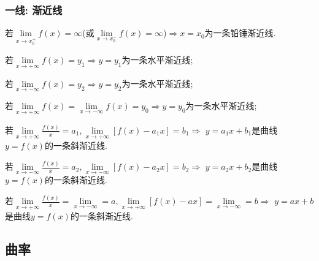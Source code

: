 \subsubsection{一线: 渐近线}
\par \vspace{.5em}
若$ \lim\limits_{x\rightarrow x_{0}^{+}}f(x)=\infty $(或$ \lim\limits_{x\rightarrow x_{0}^{-}}f(x)=\infty $)$ \Rightarrow x=x_{0} $为一条铅锤渐近线.\par \vspace{.5em}
\par \vspace{.5em}
若$ \lim\limits_{x\rightarrow +\infty}f(x)=y_{1}\Rightarrow y=y_{1} $为一条水平渐近线; \par 若$ \lim\limits_{x\rightarrow -\infty}f(x)=y_{2}\Rightarrow y=y_{2} $为一条水平渐近线;\par
若$ \lim\limits_{x\rightarrow +\infty}f(x)=\lim\limits_{x\rightarrow -\infty}f(x)=y_{0}\Rightarrow y=y_{0} $为一条水平渐近线;\par \vspace{.5em}
\par \vspace{.5em}
若$ \lim\limits_{x\rightarrow +\infty}\frac{f(x)}{x}=a_{1}, \lim\limits_{x\rightarrow +\infty}[f(x)-a_{1}x]=b_{1}\Rightarrow $ $ y=a_{1}x+b_{1} $是曲线$ y=f(x) $的一条斜渐近线. \par
若$ \lim\limits_{x\rightarrow -\infty}\frac{f(x)}{x}=a_{2}, \lim\limits_{x\rightarrow -\infty}[f(x)-a_{2}x]=b_{2}\Rightarrow $ $ y=a_{2}x+b_{2} $是曲线$ y=f(x) $的一条斜渐近线. \par
若$ \lim\limits_{x\rightarrow +\infty}\frac{f(x)}{x}=\lim\limits_{x\rightarrow -\infty}=a, \lim\limits_{x\rightarrow +\infty}[f(x)-ax]=\lim\limits_{x\rightarrow -\infty}=b\Rightarrow $ $ y=ax+b $是曲线$ y=f(x) $的一条斜渐近线. \par
\subsection{曲率}
